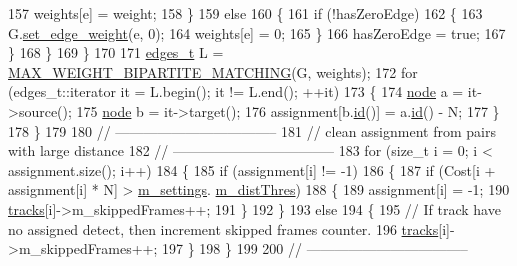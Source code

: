 \begin{DoxyCode}
157                         weights[e] = weight;
158                     \}
159                     \textcolor{keywordflow}{else}
160                     \{
161                         \textcolor{keywordflow}{if} (!hasZeroEdge)
162                         \{
163                             G.\mbox{\hyperlink{class_my_graph_a798846d9c09d7d5b49db3c75fb1f7f38}{set\_edge\_weight}}(e, 0);
164                             weights[e] = 0;
165                         \}
166                         hasZeroEdge = \textcolor{keyword}{true};
167                     \}
168                 \}
169             \}
170 
171             \mbox{\hyperlink{edge_8h_a8f9587479bda6cf612c103494b3858e3}{edges\_t}} L = \mbox{\hyperlink{mwbmatching_8cpp_ab95e8f4d49898dd718d2640d44f48fa5}{MAX\_WEIGHT\_BIPARTITE\_MATCHING}}(G, weights);
172             \textcolor{keywordflow}{for} (edges\_t::iterator it = L.begin(); it != L.end(); ++it)
173             \{
174                 \mbox{\hyperlink{classnode}{node}} a = it->source();
175                 \mbox{\hyperlink{classnode}{node}} b = it->target();
176                 assignment[b.\mbox{\hyperlink{classnode_a5d38b4152c3cedb235e45de7eb3f4469}{id}}()] = a.\mbox{\hyperlink{classnode_a5d38b4152c3cedb235e45de7eb3f4469}{id}}() - N;
177             \}
178         \}
179 
180         \textcolor{comment}{// -----------------------------------}
181         \textcolor{comment}{// clean assignment from pairs with large distance}
182         \textcolor{comment}{// -----------------------------------}
183         \textcolor{keywordflow}{for} (\textcolor{keywordtype}{size\_t} i = 0; i < assignment.size(); i++)
184         \{
185             \textcolor{keywordflow}{if} (assignment[i] != -1)
186             \{
187                 \textcolor{keywordflow}{if} (Cost[i + assignment[i] * N] > \mbox{\hyperlink{class_c_tracker_acb84aee0d550f4cdadbfac6735811050}{m\_settings}}.
      \mbox{\hyperlink{struct_tracker_settings_a10e76ae03bd840f6c9180ce67faaa83c}{m\_distThres}})
188                 \{
189                     assignment[i] = -1;
190                     \mbox{\hyperlink{class_c_tracker_a86d322bc042985711c8d5ec8b9614230}{tracks}}[i]->m\_skippedFrames++;
191                 \}
192             \}
193             \textcolor{keywordflow}{else}
194             \{
195                 \textcolor{comment}{// If track have no assigned detect, then increment skipped frames counter.}
196                 \mbox{\hyperlink{class_c_tracker_a86d322bc042985711c8d5ec8b9614230}{tracks}}[i]->m\_skippedFrames++;
197             \}
198         \}
199 
200         \textcolor{comment}{// -----------------------------------}

\end{DoxyCode}
